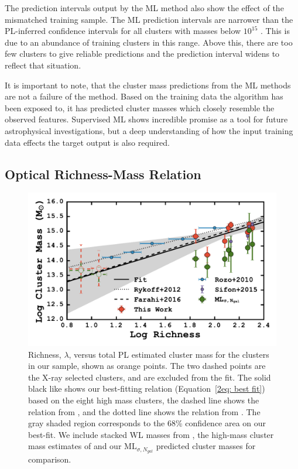 The prediction intervals output by the ML method also show the effect of the mismatched training sample. The ML prediction intervals are narrower than the PL-inferred confidence intervals for all clusters with masses below $10^{15}$ \Msol. This is due to an abundance of training clusters in this range. Above this, there are too few clusters to give reliable predictions and the prediction interval widens to reflect that situation.

It is important to note, that the cluster mass predictions from the ML methods are not a failure of the method. Based on the training data the algorithm has been exposed to, it has predicted cluster masses which closely resemble the observed features. Supervised ML shows incredible promise as a tool for future astrophysical investigations, but a deep understanding of how the input training data effects the target output is also required.

\subsection{Optical Richness-Mass Relation}
\begin{figure}[t]
	\begin{center}
		\includegraphics[width=\textwidth]{./figures2/massRichness.pdf} 
	\end{center}
	\caption[Richness versus total cluster mass for the clusters in our sample]{Richness, $\lambda$, versus total PL estimated cluster mass for the clusters in our sample, shown as orange points. The two dashed points are the X-ray selected clusters, and are excluded from the fit. The solid black like shows our best-fitting relation (Equation~\protect\ref{2eq: best fit}) based on the eight high mass clusters, the dashed line shows the relation from \protect\cite{Farahi2016}, and the dotted line shows the relation from \protect\cite{Rykoff2012}. The gray shaded region corresponds to the 68\% confidence area on our best-fit. We include stacked WL masses from \protect\cite{Rozo2010}, the high-mass cluster mass estimates of \protect\cite{Sifon2015} and our $\mathrm{ML}_{\sigma, N_{gal}}$ predicted cluster masses for comparison.}
\label{2fig:massRichness} 
\end{figure}

